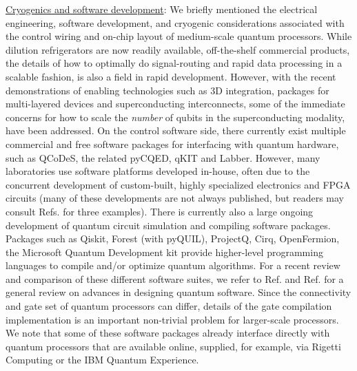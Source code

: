 \documentclass[aip,apr,twocolumn,showpacs,superscriptaddress,groupedaddress,nofootinbib,reprint]{revtex4-1}  %
\begin{document}
\underline{Cryogenics and software development}: We briefly mentioned the electrical engineering, software development, and cryogenic considerations associated with the control wiring and on-chip layout of medium-scale quantum processors. While dilution refrigerators are now readily available, off-the-shelf commercial products, the details of how to optimally do signal-routing and rapid data processing in a scalable fashion, is also a field in rapid development. However, with the recent demonstrations of enabling technologies such as 3D integration, packages for multi-layered devices and superconducting interconnects\cite{Tolpygo2015,Bejanin2016,Vahidpour2017,Rosenberg2017,Bronn2018,Foxen2018,McConkey2018}, some of the immediate concerns for how to scale the \emph{number} of qubits in the superconducting modality, have been addressed. On the control software side, there currently exist multiple commercial and free software packages for interfacing with quantum hardware, such as \textsf{QCoDeS}\cite{qcodes}, the related \textsf{pyCQED}\cite{pycqed}, \textsf{qKIT}\cite{qkit} and \textsf{Labber}\cite{LabberQuantum}. However, many laboratories use software platforms developed in-house, often due to the concurrent development of custom-built, highly specialized electronics and FPGA circuits (many of these developments are not always published, but readers may consult Refs.  for three examples). There is currently also a large ongoing development of quantum circuit simulation and compiling software packages. Packages such as \textsf{Qiskit}\cite{qiskit}, \textsf{Forest} (with \textsf{pyQUIL}\cite{Smith2016}), \textsf{ProjectQ}\cite{Steiger2016}, \textsf{Cirq}\cite{Cirq}, \textsf{OpenFermion}\cite{McClean2017}, the Microsoft Quantum Development kit\cite{MS_QDK} provide higher-level programming languages to compile and/or optimize quantum algorithms. For a recent review and comparison of these different software suites, we refer to Ref. and Ref. for a general review on advances in designing quantum software. Since the connectivity and gate set of quantum processors can differ, details of the gate compilation implementation is an important non-trivial problem for larger-scale processors. We note that some of these software packages already interface directly with quantum processors that are available online, supplied, for example, via Rigetti Computing or the IBM Quantum Experience.
\end{document}
